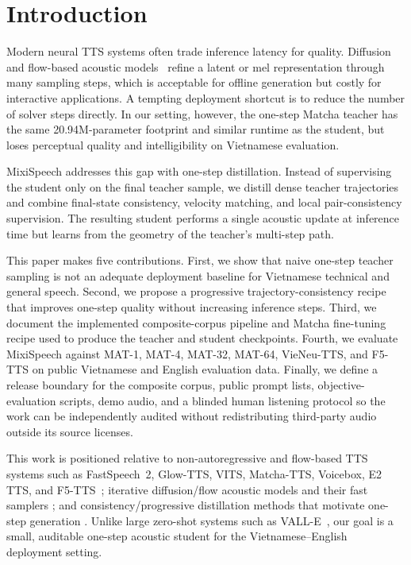 \documentclass[10pt,twoside]{article}
\newcommand{\method}{MixiSpeech}
\newcommand{\mat}{MAT}
\begin{document}
\section{Introduction}

\begingroup
\setlength{\parindent}{0pt}
\setlength{\parskip}{0.55em}

Modern neural TTS systems often trade inference latency for quality. Diffusion
and flow-based acoustic models~\cite{ddpm,flow_matching} refine a latent or mel representation through
many sampling steps, which is acceptable for offline generation but costly for
interactive applications. A tempting deployment shortcut is to reduce the number
of solver steps directly. {\color{red}In our setting, however, the one-step Matcha teacher
has the same 20.94M-parameter footprint and similar runtime as the student, but
loses perceptual quality and intelligibility on Vietnamese evaluation.}

\method{} addresses this gap with one-step distillation. Instead of supervising
the student only on the final teacher sample, we distill dense teacher
trajectories and combine final-state consistency, velocity matching, and local
pair-consistency supervision. The resulting student performs a single acoustic
update at inference time but learns from the geometry of the teacher's
multi-step path.

This paper makes five contributions. First, we show that naive one-step teacher
sampling is not an adequate deployment baseline for Vietnamese technical and
general speech. Second, we propose a progressive trajectory-consistency recipe
that improves one-step quality without increasing inference steps. Third, we
document the implemented composite-corpus pipeline and Matcha fine-tuning recipe
used to produce the teacher and student checkpoints. Fourth, we evaluate
\method{} against \mat-1, \mat-4, \mat-32, \mat-64, VieNeu-TTS, and F5-TTS on
public Vietnamese and English evaluation data. Finally, we define a release
boundary for the composite corpus, public prompt lists, objective-evaluation
scripts, demo audio, and a blinded human listening protocol so the work can be
independently audited without redistributing third-party audio outside its
source licenses.

This work is positioned relative to non-autoregressive and flow-based TTS
systems such as FastSpeech~2, Glow-TTS, VITS, Matcha-TTS, Voicebox, E2 TTS, and
F5-TTS~\cite{fastspeech2,glowtts,vits,matcha,voicebox,e2tts,f5tts}; iterative
diffusion/flow acoustic models and their fast samplers
\cite{ddpm,ddim,gradtts,difftts,prodiff}; and consistency/progressive
distillation methods that motivate one-step generation
\cite{progressive_distillation,consistency}. Unlike large zero-shot systems
such as VALL-E~\cite{valle}, our goal is a small, auditable one-step acoustic
student for the Vietnamese--English deployment setting.
\end{document}
